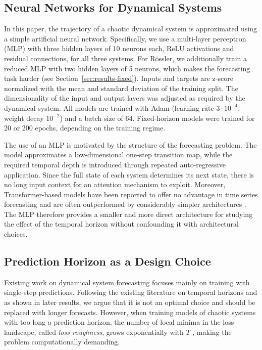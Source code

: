 \documentclass{article}
\begin{document}
\subsection{Neural Networks for Dynamical Systems}

In this paper, the trajectory of a chaotic dynamical system is approximated using a simple artificial neural network. Specifically, we use a multi-layer perceptron (MLP) with three hidden layers of 10 neurons each, ReLU activations and residual connections, for all three systems. For Rössler, we additionally train a reduced MLP with two hidden layers of 5 neurons, which makes the forecasting task harder (see Section~\ref{sec:results-fixed}). Inputs and targets are z-score normalized with the mean and standard deviation of the training split. The dimensionality of the input and output layers was adjusted as required by the dynamical system. All models are trained with Adam (learning rate $3 \cdot 10^{-4}$, weight decay $10^{-2}$) and a batch size of 64. Fixed-horizon models were trained for 20 or 200 epochs, depending on the training regime.

The use of an MLP is motivated by the structure of the forecasting problem. The model approximates a low-dimensional one-step transition map, while the required temporal depth is introduced through repeated auto-regressive application. Since the full state of each system determines its next state, there is no long input context for an attention mechanism to exploit. Moreover, Transformer-based models have been reported to offer no advantage in time series forecasting and are often outperformed by considerably simpler architectures \cite{zeng_are_2022}. The MLP therefore provides a smaller and more direct architecture for studying the effect of the temporal horizon without confounding it with architectural choices.

\subsection{Prediction Horizon as a Design Choice}

Existing work on dynamical system forecasting focuses mainly on training with single-step predictions. Following the existing literature on temporal horizons \cite{aceituno_temporal_2025} and as shown in later results, we argue that it is not an optimal choice and should be replaced with longer forecasts. However, when training models of chaotic systems with too long a prediction horizon, the number of local minima in the loss landscape, called \emph{loss roughness}, grows exponentially with $T$ \cite{aceituno_temporal_2025}, making the problem computationally demanding.
\end{document}
